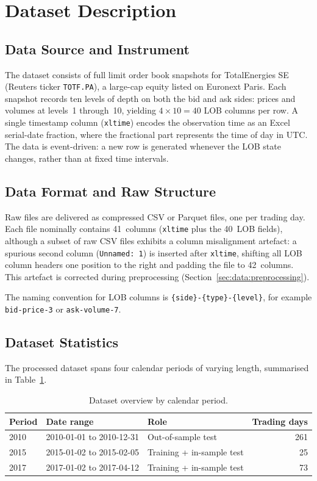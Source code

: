 \documentclass[11pt]{report}
\begin{document}
\section{Dataset Description}\label{sec:data:dataset}

\subsection{Data Source and Instrument}\label{sec:data:source}

The dataset consists of full limit order book snapshots for TotalEnergies SE (Reuters ticker \texttt{TOTF.PA}), a large-cap equity listed on Euronext Paris. Each snapshot records ten levels of depth on both the bid and ask sides: prices and volumes at levels~1 through~10, yielding $4 \times 10 = 40$ LOB columns per row. A single timestamp column (\texttt{xltime}) encodes the observation time as an Excel serial-date fraction, where the fractional part represents the time of day in UTC. The data is event-driven: a new row is generated whenever the LOB state changes, rather than at fixed time intervals.

\subsection{Data Format and Raw Structure}\label{sec:data:format}

Raw files are delivered as compressed CSV or Parquet files, one per trading day. Each file nominally contains 41~columns (\texttt{xltime} plus the 40~LOB fields), although a subset of raw CSV files exhibits a column misalignment artefact: a spurious second column (\texttt{Unnamed:~1}) is inserted after \texttt{xltime}, shifting all LOB column headers one position to the right and padding the file to 42~columns. This artefact is corrected during preprocessing (Section~\ref{sec:data:preprocessing}).

The naming convention for LOB columns is \texttt{\{side\}-\{type\}-\{level\}}, for example \texttt{bid-price-3} or \texttt{ask-volume-7}.

\subsection{Dataset Statistics}\label{sec:data:stats}

The processed dataset spans four calendar periods of varying length, summarised in Table~\ref{tab:dataset}.

\begin{table}[H]
\centering
\caption{Dataset overview by calendar period.}\label{tab:dataset}
\begin{tabular}{lllr}
\toprule
\textbf{Period} & \textbf{Date range} & \textbf{Role} & \textbf{Trading days} \\
\midrule
2010 & 2010-01-01 to 2010-12-31 & Out-of-sample test & 261 \\
2015 & 2015-01-02 to 2015-02-05 & Training + in-sample test & 25 \\
2017 & 2017-01-02 to 2017-04-12 & Training + in-sample test & 73 \\
\bottomrule
\end{tabular}
\end{table}
\end{document}
